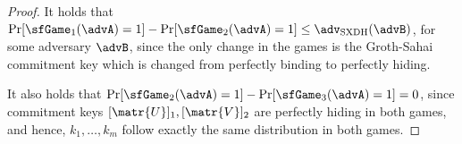 \begin{proof}
It holds that $\Pr[\sfGame_1(\advA)=1]-\Pr[\sfGame_2(\advA)=1]\leq\adv_\mathrm{SXDH}(\advB)$, for some adversary $\advB$, since the only change in the games is the Groth-Sahai commitment key which is changed from perfectly binding to perfectly hiding. %

It also holds that $\Pr[\sfGame_2(\advA)=1]-\Pr[\sfGame_3(\advA)=1]=0$, since commitment keys $[\matr{U}]_1,[\matr{V}]_2$ are perfectly hiding in both games, and hence, $k_1,\ldots,k_m$ follow exactly the same distribution in both games.


\end{proof}
